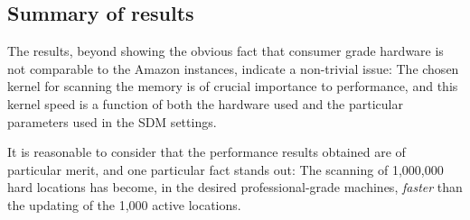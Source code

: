 \subsection{Summary of results}

The results, beyond showing the obvious fact that consumer grade hardware is not comparable to the Amazon instances, indicate a non-trivial issue:  The chosen kernel for scanning the memory is of crucial importance to performance, and this kernel speed is a function of both the hardware used and the particular parameters used in the SDM settings.

It is reasonable to consider that the performance results obtained are of particular merit, and one particular fact stands out:  The scanning of 1,000,000 hard locations has become, in the desired professional-grade machines, \emph{faster} than the updating of the 1,000 active locations.
